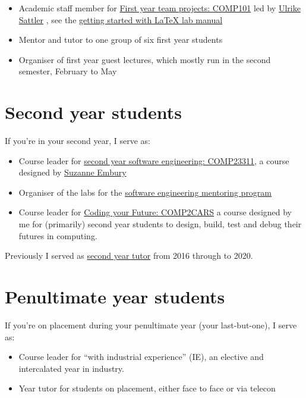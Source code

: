 \documentclass[
  12pt,
]{book}
\providecommand{\tightlist}{%
  \setlength{\itemsep}{0pt}\setlength{\parskip}{0pt}}
\begin{document}
\begin{itemize}
\tightlist
\item
  Academic staff member for \href{https://studentnet.cs.manchester.ac.uk/ugt/COMP10120/syllabus/}{First year team projects: COMP101} led by \href{http://www.cs.man.ac.uk/~sattler/}{Ulrike Sattler} \citep{COMP10120}, see the \href{http://latex4year1.netlify.app}{getting started with LaTeX lab manual}
\item
  Mentor and tutor to one group of six first year students
\item
  Organiser of first year guest lectures, which mostly run in the second semester, February to May
\end{itemize}

\hypertarget{year2}{%
\section{Second year students}\label{year2}}

If you're in your second year, I serve as:

\begin{itemize}
\tightlist
\item
  Course leader for \href{https://studentnet.cs.manchester.ac.uk/ugt/COMP23311/syllabus/}{second year software engineering: COMP23311}, a course designed by \href{http://www.cs.man.ac.uk/~embury/}{Suzanne Embury} \citep{COMP23311, git}
\item
  Organiser of the labs for the \href{https://www.cs.manchester.ac.uk/connect/business-engagement/industrial-mentoring/}{software engineering mentoring program}
\item
  Course leader for \href{https://www.cdyf.me/}{Coding your Future: COMP2CARS} a course designed by me for (primarily) second year students to design, build, test and debug their futures in computing.
\end{itemize}

Previously I served as \href{https://studentnet.cs.manchester.ac.uk/ugt/year2/}{second year tutor} from 2016 through to 2020.

\hypertarget{penultimate}{%
\section{Penultimate year students}\label{penultimate}}

If you're on placement during your penultimate year (your last-but-one), I serve as:

\begin{itemize}
\tightlist
\item
  Course leader for ``with industrial experience'' (IE), an elective and intercalated year in industry.
\item
  Year tutor for students on placement, either face to face or via telecon
\end{itemize}
\end{document}
